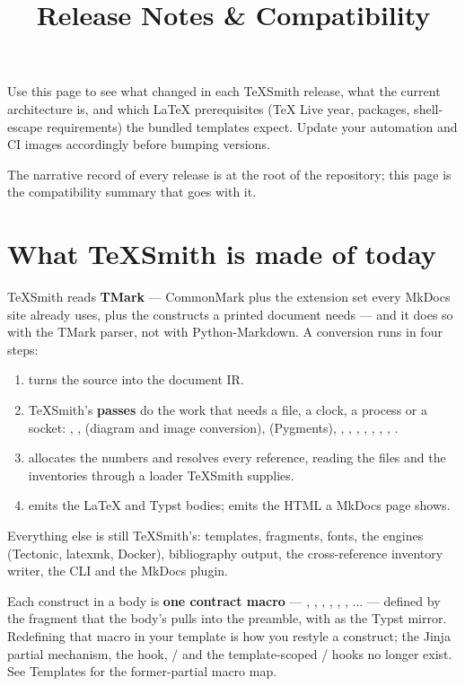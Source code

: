 \documentclass[a4paper,twoside]{article}
\title{Release Notes \& Compatibility}
\author{}\date{}
\begin{document}
\maketitle
{}\label{releasenotes}
Use this page to see what changed in each TeXSmith release, what the current
architecture is, and which \LaTeX{} prerequisites (\TeX{} Live year, 
packages, shell-escape requirements) the bundled templates expect. Update your
automation and CI images accordingly before bumping versions.

The narrative record of every release is  at the root of the
repository; this page is the compatibility summary that goes with it.
\section{What TeXSmith is made of today}
TeXSmith reads \textbf{TMark} --- CommonMark plus the extension set every MkDocs site
already uses, plus the constructs a printed document needs --- and it does so
with the TMark parser, not with Python-Markdown. A conversion runs in four
steps:
\begin{enumerate}
\item {} turns the source into the document IR.
\item TeXSmith's \textbf{passes} do the work that needs a file, a clock, a process or a
socket: , ,  (diagram and image conversion),
 (Pygments), , , , , , ,
, .
\item {} allocates the numbers and resolves every  reference,
reading the  files and the  inventories through a loader
TeXSmith supplies.
\item {} emits the \LaTeX{} and Typst bodies;  emits the
HTML a MkDocs page shows.
\end{enumerate}
Everything else is still TeXSmith's: templates, fragments, fonts, the engines
(Tectonic, latexmk, Docker), bibliography output, the cross-reference inventory
writer, the CLI and the MkDocs plugin.

Each construct in a body is \textbf{one contract macro} --- , ,
, , , , ... --- defined by the 
fragment that the body's  pulls into the preamble, with
 as the Typst mirror. Redefining that macro in
your template is how you restyle a construct; the Jinja partial mechanism, the
 hook,  /  and the
template-scoped  /  hooks no longer exist. See
Templates for the former-partial macro map.
\end{document}
